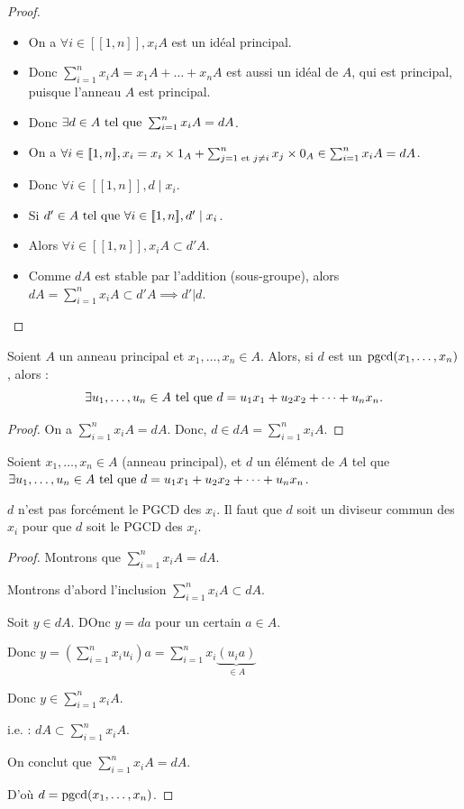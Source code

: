 \documentclass[12pt,a4paper]{report}
\begin{document}
\begin{proof}
    \begin{itemize}
        \item On a $\forall i \in [\![1,n]\!], x_iA$ est un idéal principal.
        \item Donc $\sum_{i=1}^{n}x_iA = x_1A + \dots + x_nA$ est aussi un idéal de $A$, qui est principal, puisque l'anneau $A$ est principal.
        \item Donc $\exists d \in A \text{ tel que } \sum_{i=1}^{n}x_iA = dA$.
        \item On a $\forall i \in [\![1,n]\!], x_i = x_i\times 1_A + \sum_{j=1\text{ et } j\neq i}^{n}x_j \times 0_A \in \sum_{i=1}^{n}x_iA = dA$.
        \item Donc $\forall i \in [\![1,n]\!], d \mid x_i$.
        \item Si $d' \in A \text{ tel que } \forall i \in [\![1,n]\!], d' \mid x_i$.
        \item Alors $\forall i \in [\![1,n]\!], x_iA \subset d'A$.
        \item Comme $dA$ est stable par l'addition (sous-groupe), alors $dA = \sum_{i=1}^{n}x_iA \subset d'A \implies d'|d$.
    \end{itemize}
\end{proof}

\begin{theorem}
    Soient $A$ un anneau principal et $x_1,\dots,x_n \in A$. Alors, si $d$ est un $\mathrm{pgcd}(x_1,\dots,x_n)$, alors :
    \[
        \exists u_1,\dots,u_n \in A \text{ tel que } d = u_1 x_1 + u_2 x_2 + \dots + u_n x_n.
    \]
\end{theorem}

\begin{proof}
    On a $\sum_{i=1}^{n}x_iA = dA$. Donc, $d\in dA = \sum_{i=1}^{n}x_iA$. 
\end{proof}

\begin{property}
    Soient $x_1,\dots,x_n \in A$ (anneau principal), et $d$ un élément de $A$ tel que $\exists u_1,\dots,u_n \in A \text{ tel que } d = u_1 x_1 + u_2 x_2 + \dots + u_n x_n$.

    $d$ n'est pas forcément le PGCD des $x_i$. Il faut que $d$ soit un diviseur commun des $x_i$ pour que $d$ soit le PGCD des $x_i$.
    
\end{property}

\begin{proof}
    Montrons que $\sum_{i=1}^{n}x_iA = dA$.

    Montrons d'abord l'inclusion $\sum_{i=1}^{n}x_iA \subset dA$.

    Soit $y\in dA$. DOnc $y=da$ pour un certain $a\in A$.

    Donc $y = (\sum_{i=1}^{n}x_iu_i)a=\sum_{i=1}^{n}x_i\underbrace{(u_i a)}_{\in A}$

    Donc $y \in \sum_{i=1}^{n}x_iA$.

    i.e. : $dA \subset \sum_{i=1}^{n}x_i A$.

    On conclut que $\sum_{i=1}^{n}x_iA = dA$.

    D'où $d=\mathrm{pgcd}(x_1,\dots,x_n)$.
\end{proof}
\end{document}
